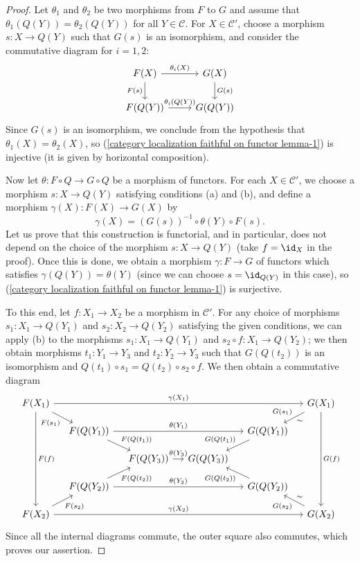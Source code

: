 \begin{proof}
Let $\theta_1$ and $\theta_2$ be two morphisms from $F$ to $G$ and assume that $\theta_1(Q(Y))=\theta_2(Q(Y))$ for all $Y\in\mathcal{C}$. For $X\in\mathcal{C}'$, choose a morphism $s:X\to Q(Y)$ such that $G(s)$ is an isomorphism, and consider the commutative diagram for $i=1,2$:
\[\begin{tikzcd}
F(X)\ar[r,"\theta_i(X)"]\ar[d,swap,"F(s)"]&G(X)\ar[d,"G(s)"]\\
F(Q(Y))\ar[r,"\theta_i(Q(Y))"]&G(Q(Y))
\end{tikzcd}\]
Since $G(s)$ is an isomorphism, we conclude from the hypothesis that $\theta_1(X)=\theta_2(X)$, so (\ref{category localization faithful on functor lemma-1}) is injective (it is given by horizontal composition).\par
Now let $\theta:F\circ Q\to G\circ Q$ be a morphism of functors. For each $X\in\mathcal{C}'$, we choose a morphism $s:X\to Q(Y)$ satisfying conditions (a) and (b), and define a morphism $\gamma(X):F(X)\to G(X)$ by
\[\gamma(X)=(G(s))^{-1}\circ \theta(Y)\circ F(s).\]
Let us prove that this construction is functorial, and in particular, does not depend on the choice of the morphism $s:X\to Q(Y)$ (take $f=\id_X$ in the proof). Once this is done, we obtain a morphism $\gamma:F\to G$ of functors which satisfies $\gamma(Q(Y))=\theta(Y)$ (since we can choose $s=\id_{Q(Y)}$ in this case), so (\ref{category localization faithful on functor lemma-1}) is surjective.\par
To this end, let $f:X_1\to X_2$ be a morphism in $\mathcal{C}'$. For any choice of morphisms $s_1:X_1\to Q(Y_1)$ and $s_2:X_2\to Q(Y_2)$ satisfying the given conditions, we can apply (b) to the morphisms $s_1:X_1\to Q(Y_1)$ and $s_2\circ f:X_1\to Q(Y_2)$; we then obtain morphisms $t_1:Y_1\to Y_3$ and $t_2:Y_2\to Y_3$ such that $G(Q(t_2))$ is an isomorphism and $Q(t_1)\circ s_1=Q(t_2)\circ s_2\circ f$. We then obtain a commutative diagram
\[\begin{tikzcd}[row sep=4mm, column sep=4mm]
F(X_1)\ar[rd,swap,"F(s_1)"]\ar[dddd,"F(f)"]\ar[rrrrr,"\gamma(X_1)"]&&&&&G(X_1)\ar[ld,swap,"G(s_1)","\sim"']\ar[dddd,"G(f)"]\\
&F(Q(Y_1))\ar[rd,"F(Q(t_1))"]\ar[rrr,"\theta(Y_1)"]&&&G(Q(Y_1))\ar[ld,swap,"G(Q(t_1))"]&\\
&&F(Q(Y_3))\ar[r,"\theta(Y_3)"]&G(Q(Y_3))&&\\
&F(Q(Y_2))\ar[ru,swap,"F(Q(t_2))"]\ar[rrr,"\theta(Y_2)"]&&&G(Q(Y_2))\ar[lu,"G(Q(t_2))"]&\\
F(X_2)\ar[ru,swap,"F(s_2)"]\ar[rrrrr,"\gamma(X_2)"]&&&&&G(X_2)\ar[lu,"G(s_2)","\sim"']
\end{tikzcd}\]
Since all the internal diagrams commute, the outer square also commutes, which proves our assertion.
\end{proof}

